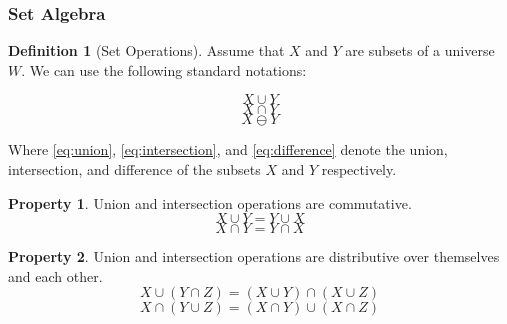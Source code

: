\documentclass[a4paper,11pt,oneside]{article}
\begin{document}
\subsubsection{Set Algebra}
  
\theoremstyle{definition}
\newtheorem{definition}{Definition}[section]
  
\theoremstyle{property}
\newtheorem{property}{Property}[section]
    
\theoremstyle{remark}
\newtheorem*{remark}{Remark}
      
\begin{definition}[Set Operations]
	Assume that $X$ and $Y$ are subsets of a universe $W$. We can use the following standard notations:
	      
	\begin{equation} \label{eq:union}
		X \cup Y
	\end{equation}
	\begin{equation} \label{eq:intersection}
		X \cap Y
	\end{equation}
	\begin{equation} \label{eq:difference}
		X \ominus Y
	\end{equation}
	        
	Where \eqref{eq:union}, \eqref{eq:intersection}, and \eqref{eq:difference} denote the union, intersection, and difference of the subsets $X$     and $Y$ respectively. \cite{mansfield_1987}
	        
\end{definition}

\begin{property}
	\label{prop:3.1}
	Union and intersection operations are commutative. \cite{mansfield_1987}
	\begin{equation*}
		X \cup Y = Y \cup X
	\end{equation*}
	\begin{equation*}
		X \cap Y = Y \cap X
	\end{equation*}
\end{property}
        
\begin{property}
	\label{prop:3.2}
	Union and intersection operations are distributive over themselves and each other. \cite{mansfield_1987}
	\begin{equation*}
		X \cup (Y \cap Z) = (X \cup Y) \cap (X \cup Z)
	\end{equation*}
	\begin{equation*}
		X \cap (Y \cup Z) = (X \cap Y) \cup (X \cap Z)
	\end{equation*}
\end{property}
        
\end{document}
